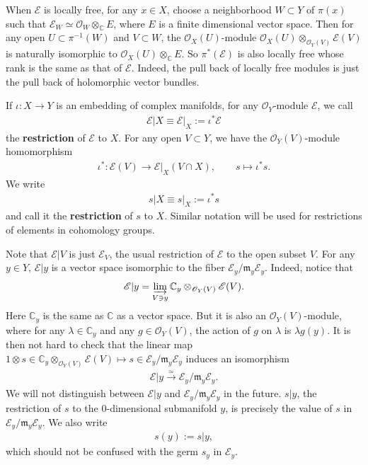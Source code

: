 \documentclass[12pt,b5paper,notitlepage]{report}
\theoremstyle{definition}
\theoremstyle{plain}
\newcommand{\fk}{\mathfrak}
\newcommand{\scr}{\mathscr}
\numberwithin{equation}{section}
\begin{document}
When $\scr E$ is locally free, for any $x\in X$, choose a neighborhood $W\subset Y$ of $\pi(x)$ such that $\scr E_W\simeq\scr O_W\otimes_{\mathbb C}E$, where $E$ is a finite dimensional vector space. Then for any open $U\subset \pi^{-1}(W)$ and $V\subset W$, the $\scr O_X(U)$-module $\scr O_X(U)\otimes_{\scr O_Y(V)}\scr E(V)$ is naturally isomorphic to $\scr O_X(U)\otimes_{\mathbb C}E$. So $\pi^*(\scr E)$ is also locally free whose rank is the same as that of $\scr E$. Indeed, the pull back of locally free modules is just the pull back of holomorphic vector bundles. 

If $\iota:X\rightarrow Y$ is an embedding of complex manifolds, for any  $\scr O_Y$-module $\scr E$, we call  
\begin{align*}
\scr E|X\equiv\scr E|_X:=\iota^*\scr E
\end{align*}
\index{EX@ $\scr E\lvert X\equiv\scr E\lvert_X,\scr E\lvert x$}the \textbf{restriction} of $\scr E$ to $X$. For any open $V\subset Y$, we have the $\scr O_Y(V)$-module homomorphism
\begin{gather*}
\iota^*:\scr E(V)\rightarrow\scr E|_X(V\cap X),\qquad s\mapsto \iota^*s.
\end{gather*}
We  write 
\begin{align*}
s|X\equiv s|_X:=\iota^*s
\end{align*}
and call it the \textbf{restriction} of $s$ to $X$. \index{EX@ ${\scr E\lvert X},\scr E\lvert x$!${s\lvert X=s\lvert_X}$} Similar notation will be used for restrictions of elements in cohomology groups.

Note that $\scr E|V$ is just $\scr E_V$,  the usual restriction of $\scr E$ to the open subset $V$.  For any $y\in Y$, $\scr E|y$ is a vector space isomorphic to the fiber $\scr E_y/\fk m_y\scr E_y$.  Indeed, notice that
\begin{align*}
\scr E|y=\varinjlim_{V\ni y}\mathbb C_y\otimes_{\scr O_Y(V)}\scr E(V).
\end{align*}
Here $\mathbb C_y$ is the same as $\mathbb C$ as a vector space. But it is also an $\scr O_Y(V)$-module, where for any $\lambda\in\mathbb C_y$ and any $g\in\scr O_Y(V)$, the action of $g$ on $\lambda$ is $\lambda g(y)$. It is then not hard to check that the linear map $1\otimes s\in\mathbb C_y\otimes_{\scr O_Y(V)}\scr E(V)\mapsto s\in\scr E_y/\fk m_y\scr E_y$ induces an isomorphism
\begin{align*}
\scr E|y\xrightarrow{\simeq}\scr E_y/\fk m_y\scr E_y.
\end{align*}
We will not distinguish between $\scr E|y$ and $\scr E_y/\fk m_y\scr E_y$ in the future. $s|y$, the restriction of $s$ to the $0$-dimensional submanifold $y$, is precisely the value of $s$ in $\scr E_y/\fk m_y\scr E_y$. We also write
\begin{align*}
s(y):=s|y,
\end{align*}
\index{EX@ ${\scr E\lvert X},\scr E\lvert x$!${s\lvert x=s(x)}$}which should not be confused with the germ $s_y$ in $\scr E_y$.
\end{document}
